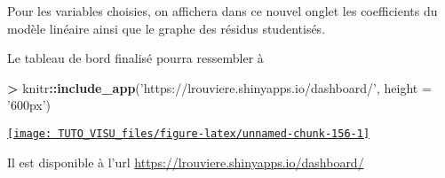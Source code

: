 \documentclass[]{book}
\newenvironment{Shaded}{\begin{snugshade}}{\end{snugshade}}
\newcommand{\DataTypeTok}[1]{\textcolor[rgb]{0.13,0.29,0.53}{#1}}
\newcommand{\KeywordTok}[1]{\textcolor[rgb]{0.13,0.29,0.53}{\textbf{#1}}}
\newcommand{\NormalTok}[1]{#1}
\newcommand{\OperatorTok}[1]{\textcolor[rgb]{0.81,0.36,0.00}{\textbf{#1}}}
\newcommand{\StringTok}[1]{\textcolor[rgb]{0.31,0.60,0.02}{#1}}
\theoremstyle{definition}
\theoremstyle{definition}
\theoremstyle{definition}
\theoremstyle{remark}
\begin{document}
Pour les variables choisies, on affichera dans ce nouvel onglet les coefficients du modèle linéaire ainsi que le graphe des résidus studentisés.

Le tableau de bord finalisé pourra ressembler à

\begin{Shaded}
\begin{Highlighting}[]
\OperatorTok{>}\StringTok{ }\NormalTok{knitr}\OperatorTok{::}\KeywordTok{include_app}\NormalTok{(}\StringTok{'https://lrouviere.shinyapps.io/dashboard/'}\NormalTok{, }\DataTypeTok{height =} \StringTok{'600px'}\NormalTok{)}
\end{Highlighting}
\end{Shaded}

\begin{center}\href{https://lrouviere.shinyapps.io/dashboard/}{\texttt{[image: TUTO\_VISU\_files/figure-latex/unnamed-chunk-156-1]} }\end{center}

Il est disponible à l'url \url{https://lrouviere.shinyapps.io/dashboard/}


\end{document}
